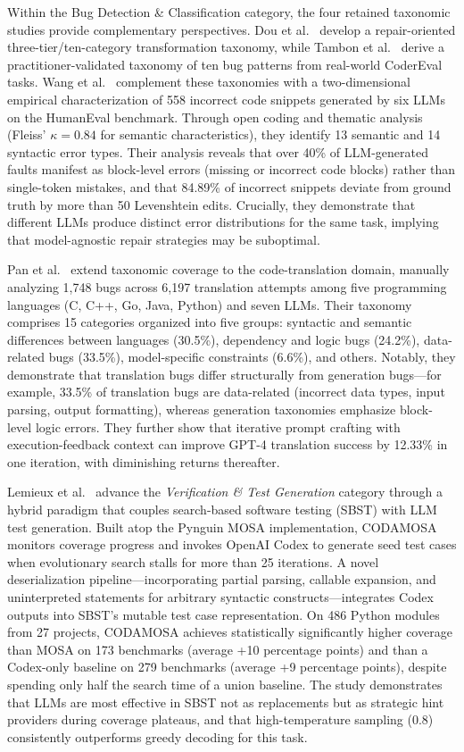 \documentclass[10pt,a4paper]{article}
\begin{document}
Within the Bug Detection \& Classification category, the four retained taxonomic studies provide complementary perspectives. Dou et al.~\cite{dou2026} develop a repair-oriented three-tier/ten-category transformation taxonomy, while Tambon et al.~\cite{tambon2025} derive a practitioner-validated taxonomy of ten bug patterns from real-world CoderEval tasks. Wang et al.~\cite{wang2025where} complement these taxonomies with a two-dimensional empirical characterization of 558 incorrect code snippets generated by six LLMs on the HumanEval benchmark. Through open coding and thematic analysis (Fleiss' $\kappa=0.84$ for semantic characteristics), they identify 13 semantic and 14 syntactic error types. Their analysis reveals that over 40\% of LLM-generated faults manifest as block-level errors (missing or incorrect code blocks) rather than single-token mistakes, and that 84.89\% of incorrect snippets deviate from ground truth by more than 50 Levenshtein edits. Crucially, they demonstrate that different LLMs produce distinct error distributions for the same task, implying that model-agnostic repair strategies may be suboptimal.

Pan et al.~\cite{pan2024lost} extend taxonomic coverage to the code-translation domain, manually analyzing 1,748 bugs across 6,197 translation attempts among five programming languages (C, C++, Go, Java, Python) and seven LLMs. Their taxonomy comprises 15 categories organized into five groups: syntactic and semantic differences between languages (30.5\%), dependency and logic bugs (24.2\%), data-related bugs (33.5\%), model-specific constraints (6.6\%), and others. Notably, they demonstrate that translation bugs differ structurally from generation bugs---for example, 33.5\% of translation bugs are data-related (incorrect data types, input parsing, output formatting), whereas generation taxonomies emphasize block-level logic errors. They further show that iterative prompt crafting with execution-feedback context can improve GPT-4 translation success by 12.33\% in one iteration, with diminishing returns thereafter.

Lemieux et al.~\cite{lemieux2023codamosa} advance the \textit{Verification \& Test Generation} category through a hybrid paradigm that couples search-based software testing (SBST) with LLM test generation. Built atop the Pynguin MOSA implementation, CODAMOSA monitors coverage progress and invokes OpenAI Codex to generate seed test cases when evolutionary search stalls for more than 25 iterations. A novel deserialization pipeline---incorporating partial parsing, callable expansion, and uninterpreted statements for arbitrary syntactic constructs---integrates Codex outputs into SBST's mutable test case representation. On 486 Python modules from 27 projects, CODAMOSA achieves statistically significantly higher coverage than MOSA on 173 benchmarks (average +10 percentage points) and than a Codex-only baseline on 279 benchmarks (average +9 percentage points), despite spending only half the search time of a union baseline. The study demonstrates that LLMs are most effective in SBST not as replacements but as strategic hint providers during coverage plateaus, and that high-temperature sampling (0.8) consistently outperforms greedy decoding for this task.
\end{document}
